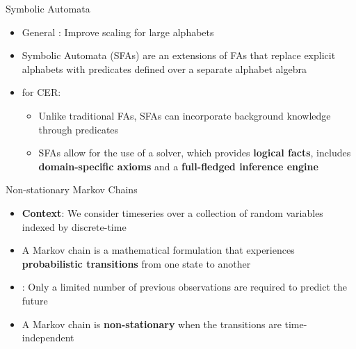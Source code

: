 \documentclass[10pt, aspectratio=169]{beamer}
\begin{document}
\begin{frame}{Symbolic Automata}
    \begin{itemize}
        \setlength{\itemsep}{12pt}
         \item General : Improve scaling for large alphabets
        \item Symbolic Automata (SFAs) are an extensions of FAs that replace explicit alphabets with predicates defined over a separate alphabet algebra
        \item {} for \textcolor{umBlueLighter}{CER}:
        \vspace{0.6em}
            \begin{itemize}
            \setlength{\itemsep}{4pt}
                \item Unlike traditional FAs, SFAs can incorporate background knowledge through predicates
                \item SFAs allow for the use of a solver, which provides \textbf{logical facts}, includes \textbf{domain-specific axioms} and a \textbf{full-fledged inference engine} 
            \end{itemize}
    \end{itemize}
\end{frame}

\begin{frame}{Non-stationary Markov Chains}
    \begin{itemize}
        \setlength{\itemsep}{12pt}
         \item \textbf{Context}: We consider timeseries over a collection of random variables indexed by discrete-time 
         \item A \textcolor{umBlueLighter}{Markov chain} is a mathematical formulation that experiences \textbf{ probabilistic transitions} from one state to another
         \item {}: Only a limited number of previous observations are required to predict the future
         \item A Markov chain is \textbf{non-stationary} when the transitions are time-independent
    \end{itemize}
\end{frame}
\end{document}
